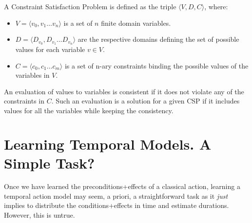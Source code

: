 \documentclass[runningheads]{llncs}
\newcommand{\tup}[1]{{\langle #1 \rangle}}
\begin{document}
A Constraint Satisfaction Problem is defined as the triple $\tup{V,D,C}$, where:

\begin{itemize}

\item $V=\tup{v_0,v_1 \ldots v_n}$ is a set of $n$ finite domain variables.

\item $D=\tup{D_{v_0},D_{v_1} \ldots D_{v_n}}$ are the respective domains defining the set of possible values for each variable $v \in V$.

\item $C=\tup{c_0,c_1 \ldots c_m}$ is a set of n-ary constraints binding the possible values of the variables in $V$.

\end{itemize}

An evaluation of values to variables is consistent if it does not violate any of the constraints in $C$. Such an evaluation is a solution for a given CSP if it includes values for all the variables while keeping the consistency.


\section{Learning Temporal Models. A Simple Task?}
\label{sec:preliminarynotes}


Once we have learned the preconditions+effects of a classical action, learning a temporal action model may seem, a priori, a straightforward task as it \emph{just} implies to distribute the conditions+effects in time and estimate durations. However, this is untrue.
\end{document}
